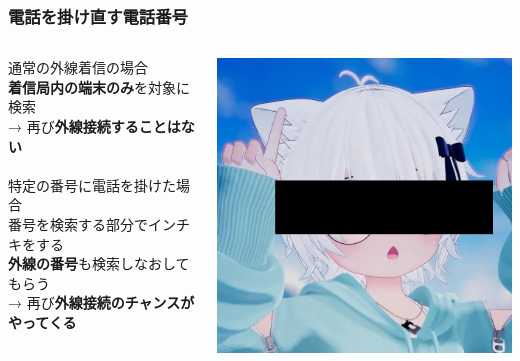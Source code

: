 \documentclass[
  lualatex,
  aspectratio=169,
  14pt
]{beamer}
\begin{document}
\begin{frame}
  \frametitle{電話を掛け直す電話番号}

  \begin{columns}
    \begin{column}{.7\textwidth}
      通常の外線着信の場合\\
      \hspace{1.5\zw}\textbf{着信局内の端末のみ}を対象に検索\\
      \hspace{1.5\zw}→ 再び\textbf{外線接続することはない}
      \\~\\[-.5\baselineskip]

      特定の番号に電話を掛けた場合\\
      \hspace{1.5\zw}番号を検索する部分でインチキをする\\
      \hspace{1.5\zw}\textbf{外線の番号}も検索しなおしてもらう\\
      \hspace{1.5\zw}→ 再び\textbf{外線接続のチャンスがやってくる}
    \end{column}
    \begin{column}{.29\textwidth}
      \includegraphics[width=\linewidth]{./images/jiminy.jpg}
    \end{column}
  \end{columns}
\end{frame}
\end{document}
